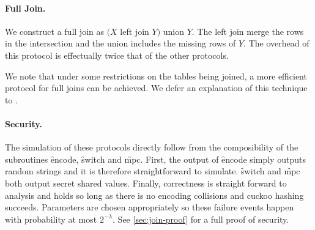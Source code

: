 \paragraph{Full Join.}
We construct a full join as $(X$ left join $Y)$ union $Y$. The left join merge the rows in the intersection and the union includes the missing rows of $Y$. The overhead of this protocol is effectually twice that of the other protocols. 

We note that under some restrictions on the tables being joined, a more efficient protocol for full joins can be achieved. We defer an explanation of this technique to .

\paragraph{Security.} The simulation of these protocols directly follow from the composibility of the subroutines \f{encode}, \f{switch} and \f{mpc}. First, the output of \f{encode} simply outputs random strings and it is therefore straightforward to simulate.  \f{switch} and \f{mpc} both output secret shared values. Finally, correctness is straight forward to analysis and holds so long as there is no encoding collisions and cuckoo hashing succeeds. Parameters are chosen appropriately so these failure events happen with probability at most $2^{-\lambda}$. See \ref{sec:join-proof} for a full proof of security.

